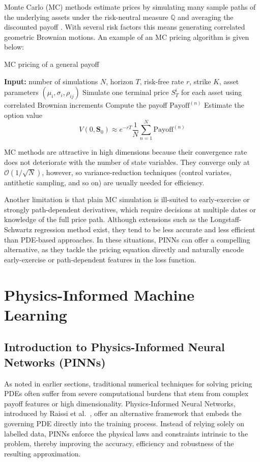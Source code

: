 \documentclass[12pt]{report} %
\theoremstyle{plain} %
\theoremstyle{definition} %
\theoremstyle{remark} %
\begin{document}
Monte Carlo (MC) methods estimate prices by simulating many sample paths of the
underlying assets under the risk-neutral measure \(\mathbb Q\) and averaging the
discounted payoff \cite{glasserman2004monte}. With several risk factors this
means generating correlated geometric Brownian motions. An example of an MC
pricing algorithm is given below:
\begin{algorithm}[H]
 \caption{MC pricing of a general payoff}
 \begin{algorithmic}[1]
 \STATE \textbf{Input:} number of simulations \(N\), horizon \(T\), risk-free
 rate \(r\), strike \(K\), asset parameters
 \((\mu_i,\sigma_i,\rho_{ij})\)
 \STATE Simulate one terminal price \(S_T^{i}\) for each asset
 using correlated Brownian increments
 \STATE Compute the payoff
 \(\text{Payoff}^{(n)}\)
 \ENDFOR
 \STATE Estimate the option value
 \[
 V(0,\mathbf S_0)\approx e^{-rT} 
 \frac1N\sum_{n=1}^{N}\text{Payoff}^{(n)}
 \]
 \end{algorithmic}
\end{algorithm}

MC methods are attractive in high dimensions because their convergence rate
does not deteriorate with the number of state variables. They converge only at
\(\mathcal{O}(1/\sqrt N)\), however, so variance-reduction techniques (control
variates, antithetic sampling, and so on) are usually needed for efficiency.

Another limitation is that plain MC simulation is ill-suited to early-exercise
or strongly path-dependent derivatives, which require decisions at multiple
dates or knowledge of the full price path. Although extensions such as the
Longstaff-Schwartz regression method \cite{longstaffshawrtz} exist, they tend
to be less accurate and less efficient than PDE-based approaches. In these
situations, PINNs can offer a compelling
alternative, as they tackle the pricing equation directly and naturally encode
early-exercise or path-dependent features in the loss function.

\chapter{Physics-Informed Machine Learning}

\section{Introduction to Physics-Informed Neural Networks (PINNs)}
As noted in earlier sections, traditional numerical techniques for solving
pricing PDEs often suffer from severe
computational burdens that stem from complex payoff features or high
dimensionality. Physics-Informed Neural Networks, introduced by Raissi
et al.\ \cite{RAISSI2019686}, offer an alternative framework that embeds the
governing PDE directly into the training process. Instead of relying solely on
labelled data, PINNs enforce the physical laws and constraints intrinsic to the
problem, thereby improving the accuracy, efficiency and robustness of the
resulting approximation.
\end{document}
